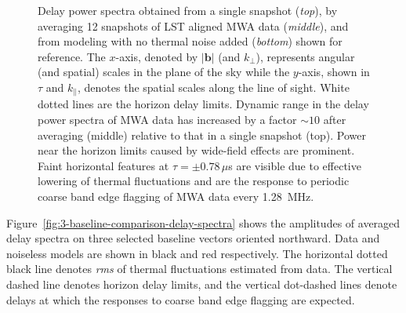 \documentclass[preprint2,apjl,numberedappendix,twocolappendix,appendixfloats]{emulateapj}
\begin{document}
\begin{figure}[htb]
\caption{Delay power spectra obtained from a single snapshot ({\it top}), by averaging 12 snapshots of LST aligned MWA data ({\it middle}), and from modeling with no thermal noise added ({\it bottom}) shown for reference. The $x$-axis, denoted by $|\boldsymbol{b}|$ (and $k_\perp$), represents angular (and spatial) scales in the plane of the sky while the $y$-axis, shown in $\tau$ and $k_\parallel$, denotes the spatial scales along the line of sight. White dotted lines are the horizon delay limits. Dynamic range in the delay power spectra of MWA data has increased by a factor $\sim 10$ after averaging (middle) relative to that in a single snapshot (top). Power near the horizon limits caused by wide-field effects are prominent. Faint horizontal features at $\tau=\pm 0.78\,\mu$s are visible due to effective lowering of thermal fluctuations and are the response to periodic coarse band edge flagging of MWA data every 1.28~MHz. \label{fig:delay-spectra}}
\end{figure}

Figure~\ref{fig:3-baseline-comparison-delay-spectra} shows the amplitudes of averaged delay spectra on three selected baseline vectors oriented northward. Data and noiseless models are shown in black and red respectively. The horizontal dotted black line denotes {\it rms} of thermal fluctuations estimated from data. The vertical dashed line denotes horizon delay limits, and the vertical dot-dashed lines denote delays at which the responses to coarse band edge flagging are expected.
\end{document}
